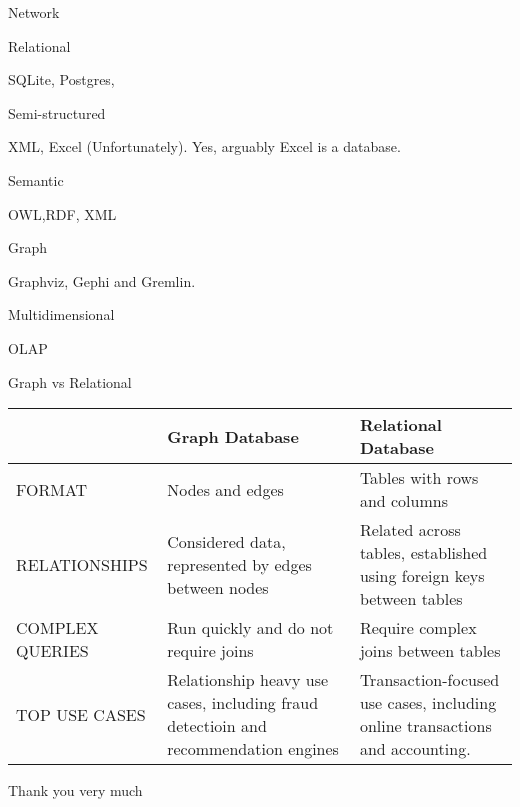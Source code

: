 \documentclass[usenames,dvipsnames,10pt]{beamer}
\begin{document}
\begin{frame}{Network}

\end{frame}

\begin{frame}{Relational}

    SQLite, Postgres, 
\end{frame}

\begin{frame}{Semi-structured}

    XML, Excel (Unfortunately). Yes, arguably Excel is a database.
\end{frame}

\begin{frame}{Semantic}

    OWL,RDF, XML
\end{frame}

\begin{frame}{Graph}

    Graphviz, Gephi and Gremlin.
\end{frame}

\begin{frame}{Multidimensional}

    OLAP

\end{frame}

\begin{frame}{Graph vs Relational}

    \begin{flushleft}
    \begin{tabular}{p{} | p{} p{} }
        & \textbf{Graph Database} & \textbf{Relational Database} \\
        \hline
        FORMAT  & Nodes and edges & Tables with rows and columns \\
        RELATIONSHIPS & Considered data, represented by edges between nodes & Related across tables, established using foreign keys between tables \\
        COMPLEX QUERIES & Run quickly and do not require joins & Require complex joins between tables \\
        TOP USE CASES & Relationship heavy use cases, including fraud detectioin and recommendation engines & Transaction-focused use cases, including online transactions and accounting. \\
    \end{tabular}
    \end{flushleft}

\end{frame}

\begin{frame}
    Thank you very much
    \finalpage
\end{frame}
\end{document}
